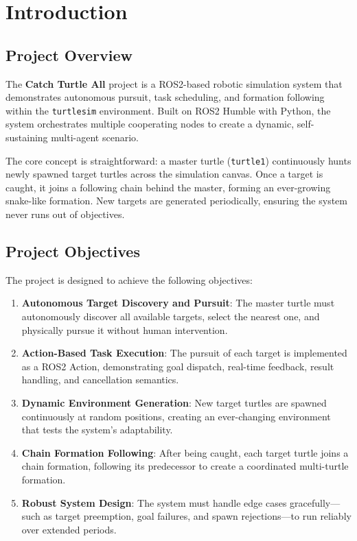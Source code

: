 \chapter{Introduction\label{chap:introduction}}

\section{Project Overview}

The \textbf{Catch Turtle All} project is a ROS2-based robotic simulation system that demonstrates autonomous pursuit, task scheduling, and formation following within the \texttt{turtlesim} environment. Built on ROS2 Humble with Python, the system orchestrates multiple cooperating nodes to create a dynamic, self-sustaining multi-agent scenario.

The core concept is straightforward: a master turtle (\texttt{turtle1}) continuously hunts newly spawned target turtles across the simulation canvas. Once a target is caught, it joins a following chain behind the master, forming an ever-growing snake-like formation. New targets are generated periodically, ensuring the system never runs out of objectives.

\section{Project Objectives}

The project is designed to achieve the following objectives:

\begin{enumerate}[label=\textbf{O\arabic*:}]
  \item \textbf{Autonomous Target Discovery and Pursuit}: The master turtle must autonomously discover all available targets, select the nearest one, and physically pursue it without human intervention.

  \item \textbf{Action-Based Task Execution}: The pursuit of each target is implemented as a ROS2 Action, demonstrating goal dispatch, real-time feedback, result handling, and cancellation semantics.

  \item \textbf{Dynamic Environment Generation}: New target turtles are spawned continuously at random positions, creating an ever-changing environment that tests the system's adaptability.

  \item \textbf{Chain Formation Following}: After being caught, each target turtle joins a chain formation, following its predecessor to create a coordinated multi-turtle formation.

  \item \textbf{Robust System Design}: The system must handle edge cases gracefully---such as target preemption, goal failures, and spawn rejections---to run reliably over extended periods.
\end{enumerate}

